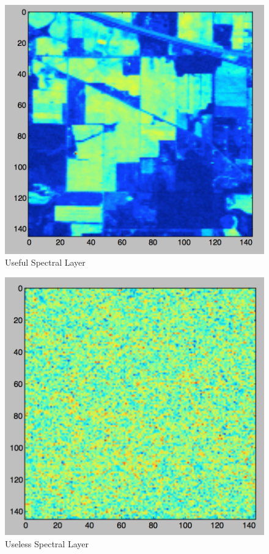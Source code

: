 \documentclass[journal]{IEEEtran}
\begin{document}
    \begin{figure}[h!]
      \centering\includegraphics[width=\columnwidth]{images/allStarSpec.png}
      \caption{Useful Spectral Layer}
      \label{fig:GoodLayer}
    \end{figure}

    \begin{figure}[h!]
      \centering\includegraphics[width=\columnwidth]{images/horribleSpec.png}
      \caption{Useless Spectral Layer}
      \label{fig:BadLayer}
    \end{figure}
\end{document}
